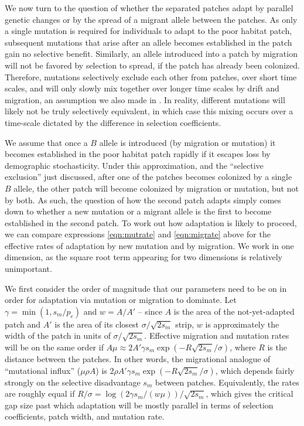 \documentclass{article}
\newcommand{\linelabel}[1]{}
\newcommand{\citep}[1]{\cite{#1}}
\begin{document}
We now turn to the question of whether the separated patches adapt by parallel genetic changes 
or by the spread of a migrant allele between the patches.
As only a single mutation is required for individuals to adapt to the
poor habitat patch, subsequent mutations that arise after an allele becomes established in the patch gain no selective benefit. 
Similarly, an allele introduced into a patch by migration will not be favored by selection to spread, 
if the patch has already been colonized. 
Therefore, mutations selectively exclude each other from patches, over short time scales, 
and will only slowly mix together over longer time scales by drift and migration,
an assumption we also made in \citep{ralph2010parallel}. 
In reality, different mutations will likely not be truly selectively equivalent,
in which case this mixing occurs over a time-scale dictated by the difference in selection coefficients.

We assume that once a $B$ allele is introduced (by migration or mutation) 
it becomes established in the poor habitat patch rapidly
if it escapes loss by demographic stochasticity.
Under this approximation, and the ``selective exclusion'' just discussed,
after one of the patches becomes colonized by a single $B$ allele, 
the other patch will become colonized by migration or mutation, but not by both. 
As such, the question of how the second patch adapts
simply comes down to whether a new mutation or a migrant allele is the first to become established in the second patch. 
To work out how adaptation is likely to proceed, 
we can compare expressions \eqref{eqn:mutrate} and \eqref{eqn:migrate} above
for the effective rates of adaptation by new mutation and by migration.
We work in one dimension, as the square root term appearing for two dimensions is relatively unimportant.
\linelabel{rr:sqrt_term}

We first consider the order of magnitude that our parameters need to
be on in order for adaptation via mutation or migration to dominate.
Let $\gamma = \min(1,s_m/p_e)$
and $w = A/A'$ 
-- since $A$ is the area of the not-yet-adapted patch and $A'$ is the area of its closest $\sigma/\sqrt{2s_m}$ strip,
$w$ is approximately the width of the patch in units of $\sigma/\sqrt{2s_m}$.
Effective migration and mutation rates will be on the same order if 
$A \mu \approx 2 A' \gamma s_m \exp(- R \sqrt{2 s_m} / \sigma)$,
where $R$ is the distance between the patches.
In other words, the migrational analogue of ``mutational influx'' ($\mu \rho A$) 
is $2 \rho A' \gamma s_m \exp(- R \sqrt{2 s_m} / \sigma)$,
which depends fairly strongly on the selective disadvantage $s_m$ between patches.
Equivalently, the rates are roughly equal if
$R/\sigma = \log(2 \gamma s_m/(w \mu))/\sqrt{2s_m}$,
which gives the critical gap size past which adaptation will be mostly parallel
in terms of selection coefficients, patch width, and mutation rate.
\end{document}
